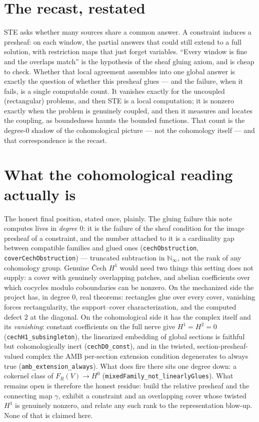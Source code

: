\documentclass[11pt]{article}
\newcommand{\code}[1]{\texttt{#1}}
\begin{document}
\section*{The recast, restated}
STE asks whether many sources share a common answer.  A constraint
induces a presheaf: on each window, the partial answers that could
still extend to a full solution, with restriction maps that just forget
variables.  ``Every window is fine and the overlaps match'' is the
hypothesis of the sheaf gluing axiom, and is cheap to check.  Whether
that local agreement assembles into one global answer is exactly the
question of whether this presheaf glues --- and the failure, when it
fails, is a single computable count.  It vanishes exactly for the
uncoupled (rectangular) problems, and then STE is a local computation;
it is nonzero exactly when the problem is genuinely coupled, and then
it measures and locates the coupling, as boundedness haunts the bounded
functions.  That count is the degree-$0$ shadow of the cohomological
picture --- not the cohomology itself --- and that correspondence is the
recast.

\section*{What the cohomological reading actually is}
The honest final position, stated once, plainly.  The gluing failure
this note computes lives in \emph{degree $0$}: it is the failure of the
sheaf condition for the image presheaf of a constraint, and the number
attached to it is a cardinality gap between compatible families and
glued ones (\code{cechObstruction}, \code{coverCechObstruction}) ---
truncated subtraction in $\mathbb{N}_\infty$, not the rank of any
cohomology group.  Genuine \v{C}ech $H^1$ would need two things this
setting does not supply: a cover with genuinely overlapping patches, and
abelian coefficients over which cocycles modulo coboundaries can be
nonzero.  On the mechanized side the project has, in degree $0$, real
theorems: rectangles glue over every cover, vanishing forces
rectangularity, the support--cover characterization, and the computed
defect $2$ at the diagonal.  On the cohomological side it has the
complex itself and its \emph{vanishing}: constant coefficients on the
full nerve give $H^1 = H^2 = 0$ (\code{cechH1\_subsingleton}), the
linearized embedding of global sections is faithful but cohomologically
inert (\code{cechD0\_const}), and in the twisted, section-presheaf-valued
complex the AMB per-section extension condition degenerates to always
true (\code{amb\_extension\_always}).  What does fire there sits one
degree down: a cokernel class of $F_R(V)\to H^0$
(\code{mixedFamily\_not\_linearlyGlues}).  What remains open is
therefore the honest residue: build the relative presheaf and the
connecting map $\gamma$, exhibit a constraint and an overlapping cover
whose twisted $H^1$ is genuinely nonzero, and relate any such rank to
the representation blow-up.  None of that is claimed here.



\end{document}
